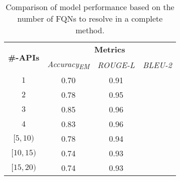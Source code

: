 \begin{table}[]
\centering
\begin{tabular}{l|ccc}
\toprule
\multirow{2}{*}{\textbf{\#-APIs}} & \multicolumn{3}{c}{\textbf{Metrics}}                                  \\ \cline{2-4} 
                                   & \multicolumn{1}{c|}{\textit{Accuracy\textsubscript{EM}}} & \multicolumn{1}{c|}{\textit{ROUGE-L}} & \textit{BLEU-2} \\ \hline
\multicolumn{1}{c|}{$1$}      & \multicolumn{1}{c|}{0.70}         & \multicolumn{1}{c|}{0.91}        &   \\
\multicolumn{1}{c|}{$2$}      & \multicolumn{1}{c|}{0.78}         & \multicolumn{1}{c|}{0.95}        &   \\ 
\multicolumn{1}{c|}{$3$}      & \multicolumn{1}{c|}{0.85}         & \multicolumn{1}{c|}{0.96}        &   \\ 
\multicolumn{1}{c|}{$4$}      & \multicolumn{1}{c|}{0.83}         & \multicolumn{1}{c|}{0.96}        &   \\ 
\multicolumn{1}{c|}{$[5, 10)$}      & \multicolumn{1}{c|}{0.78}         & \multicolumn{1}{c|}{0.94}        &   \\ 
\multicolumn{1}{c|}{$[10, 15)$}      & \multicolumn{1}{c|}{0.74}         & \multicolumn{1}{c|}{0.93}        &   \\ 
\multicolumn{1}{c|}{$[15, 20)$}      & \multicolumn{1}{c|}{0.74}         & \multicolumn{1}{c|}{0.93}        &   \\ \bottomrule
\end{tabular}
\caption{Comparison of model performance based on the number of FQNs to resolve in a complete method.}
\label{tab:strat-eval}
\end{table}